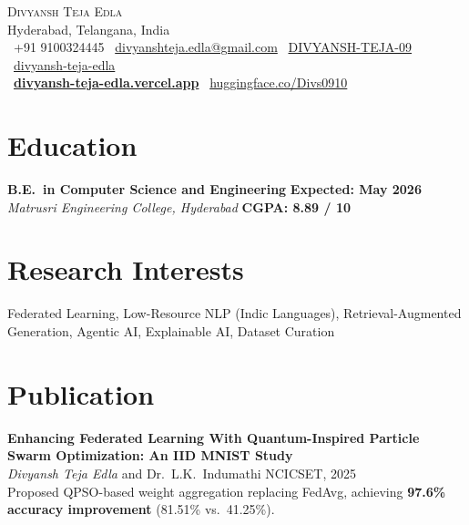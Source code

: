 \documentclass[letterpaper,10pt]{article}
\begin{document}
\begin{center}
{\Huge \scshape Divyansh Teja Edla} \\[3pt]
{\small Hyderabad, Telangana, India} \\[4pt]
{\small
\faPhone\ +91 9100324445 \quad
\faEnvelope\ \href{mailto:divyanshteja.edla@gmail.com}{divyanshteja.edla@gmail.com} \quad
\faGithub\ \href{https://github.com/DIVYANSH-TEJA-09}{DIVYANSH-TEJA-09} \quad
\faLinkedin\ \href{https://linkedin.com/in/divyansh-teja-edla-18557b28b}{divyansh-teja-edla}
}\\[2pt]
{\small
\faGlobe\ \href{https://divyansh-teja-edla.vercel.app}{\textbf{divyansh-teja-edla.vercel.app}} \quad
\faDatabase\ \href{https://huggingface.co/Divs0910}{huggingface.co/Divs0910}
}
\end{center}
\vspace{-6pt}

\section{Education}
\textbf{B.E.\ in Computer Science and Engineering} \hfill \textbf{Expected: May 2026} \\
\textit{Matrusri Engineering College, Hyderabad} \hfill \textbf{CGPA: 8.89 / 10}

\section{Research Interests}
Federated Learning, Low-Resource NLP (Indic Languages), Retrieval-Augmented Generation, Agentic AI, Explainable AI, Dataset Curation
\vspace{-2pt}

\section{Publication}
\textbf{Enhancing Federated Learning With Quantum-Inspired Particle Swarm Optimization: An IID MNIST Study} \\
\textit{Divyansh Teja Edla} and Dr.\ L.K.\ Indumathi \hfill NCICSET, 2025 \\
Proposed QPSO-based weight aggregation replacing FedAvg, achieving \textbf{97.6\% accuracy improvement} (81.51\% vs.\ 41.25\%).

\end{document}
